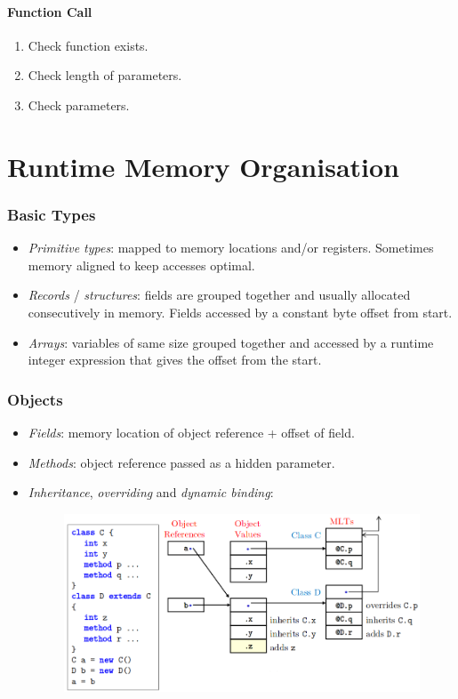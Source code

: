 \documentclass[twocolumn,english]{article}
\begin{document}
\paragraph{Function Call}
\begin{enumerate}
\item Check function exists.
\item Check length of parameters.
\item Check parameters.
\end{enumerate}

\section{Runtime Memory Organisation}

\subsubsection*{Basic Types}
\begin{itemize}
\item \emph{Primitive types}: mapped to memory locations and/or registers.
Sometimes memory aligned to keep accesses optimal.
\item \emph{Records} / \emph{structures}: fields are grouped together and
usually allocated consecutively in memory. Fields accessed by a constant
byte offset from start.
\item \emph{Arrays}: variables of same size grouped together and accessed
by a runtime integer expression that gives the offset from the start.
\end{itemize}

\subsubsection*{Objects}
\begin{itemize}
\item \emph{Fields}: memory location of object reference + offset of field.
\item \emph{Methods}: object reference passed as a hidden parameter.
\item \emph{Inheritance}, \emph{overriding} and \emph{dynamic binding}:
\begin{figure}[H]
\centering{}\includegraphics[width=0.75\linewidth]{img/objects}
\end{figure}
\end{itemize}
\end{document}
